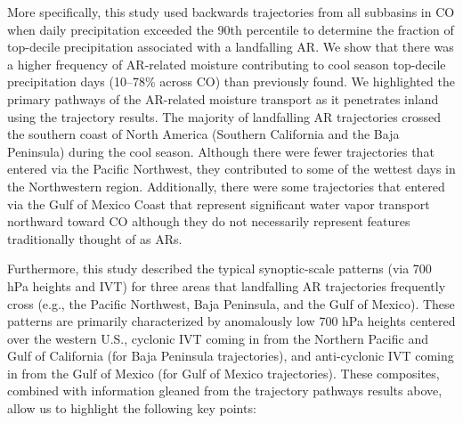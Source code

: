 \documentclass[draft]{agujournal2019}
\begin{document}

More specifically, this study used backwards trajectories from all subbasins in CO when daily precipitation exceeded the 90th percentile to determine the fraction of top-decile precipitation associated with a landfalling AR. We show that there was a higher frequency of AR-related moisture contributing to cool season top-decile precipitation days (10--78\% across CO) than previously found. We highlighted the primary pathways of the AR-related moisture transport as it penetrates inland using the trajectory results. The majority of landfalling AR trajectories crossed the southern coast of North America (Southern California and the Baja Peninsula) during the cool season. Although there were fewer trajectories that entered via the Pacific Northwest, they contributed to some of the wettest days in the Northwestern region. Additionally, there were some trajectories that entered via the Gulf of Mexico Coast that represent significant water vapor transport northward toward CO although they do not necessarily represent features traditionally thought of as ARs.

Furthermore, this study described the typical synoptic-scale patterns (via 700 hPa heights and IVT) for three areas that landfalling AR trajectories frequently cross (e.g., the Pacific Northwest, Baja Peninsula, and the Gulf of Mexico). These patterns are primarily characterized by anomalously low 700 hPa heights centered over the western U.S., cyclonic IVT coming in from the Northern Pacific and Gulf of California (for Baja Peninsula trajectories), and anti-cyclonic IVT coming in from the Gulf of Mexico (for Gulf of Mexico trajectories). These composites, combined with information gleaned from the trajectory pathways results above, allow us to highlight the following key points:
\end{document}
